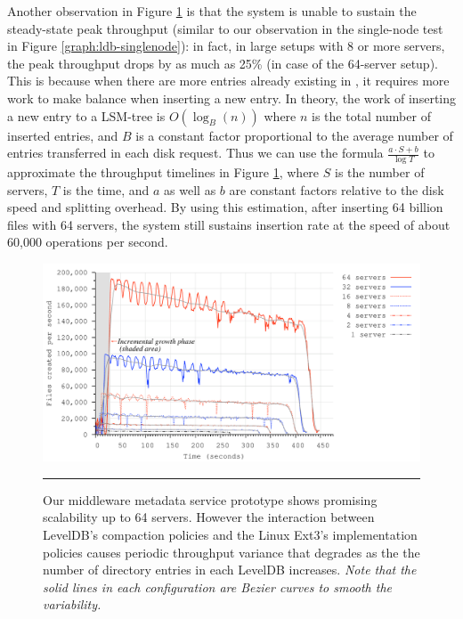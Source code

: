 Another observation in Figure \ref{graph:ldb-scaling} is that the system is
unable to sustain the steady-state peak throughput (similar to our observation
in the single-node test in Figure \ref{graph:ldb-singlenode}): 
in fact, in large setups with 8 or more servers, 
the peak throughput drops by as much as 25\% (in case of the 64-server setup).
This is because when there are more entries already existing in \ldb, 
it requires more work to make \ldb balance when inserting a new entry.
In theory, the work of inserting a new entry to a LSM-tree is $O(\log_{B}(n))$
where $n$ is the total number of inserted entries, and $B$ is a constant factor
proportional to the average number of entries transferred in each disk request. 
Thus we can use the formula $\frac{a\cdot S+b}{\log{T}}$ to
approximate the throughput timelines in Figure \ref{graph:ldb-scaling},
where $S$ is the number of servers, $T$ is the time, and $a$ as well as $b$ 
are constant factors relative to the disk speed and splitting overhead.
By using this estimation, after inserting 64 billion files with 64 servers,
the system still sustains insertion rate at the speed of about 60,000 operations per second.

\begin{figure}[t]  %
\centerline{\includegraphics[scale=0.33]{./figs/ldb_insertrate}}
\caption{
{\small
Our middleware metadata service prototype shows promising scalability
up to 64 servers. However the interaction between LevelDB's compaction policies and 
the Linux Ext3's implementation policies causes periodic throughput variance
that degrades as the the number of directory entries in each LevelDB
increases. \textit{Note that the solid lines in each configuration are Bezier
curves to smooth the variability.}
}
}
\vspace{15pt}
\hrule 
\label{graph:ldb-scaling}
\end{figure}       %

